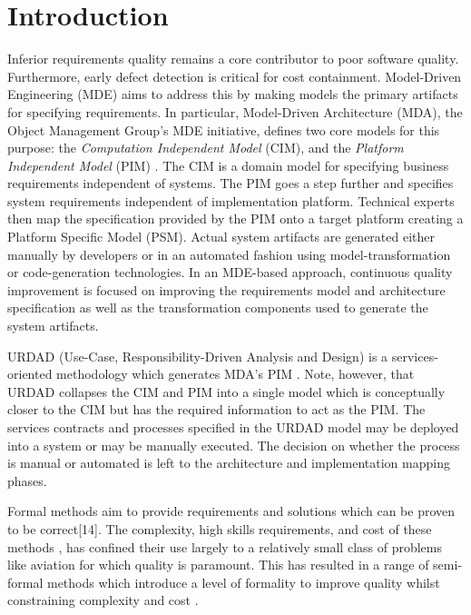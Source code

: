 \section{Introduction}\label{sec:Introduction}

Inferior requirements quality remains a core contributor to poor software quality\cite{heck_experiences_2008,_strategies_2011}. Furthermore, early defect detection is critical for cost containment\cite{betterReferenceThanBoehm1981WhichReliesOnWaterfall}. Model-Driven Engineering (MDE) \cite{frankel_model_2003} aims to address this by making models the primary artifacts for specifying requirements. In particular, Model-Driven Architecture (MDA), the Object Management Group's MDE initiative, defines two core models for this purpose: the \emph{Computation Independent Model} (CIM), and the \emph{Platform Independent Model} (PIM) \cite{_mda_2003}. The CIM is a domain model for specifying business requirements independent of systems. The PIM goes a step further and specifies system requirements independent of implementation platform. Technical experts then map the specification provided by the PIM onto a target platform creating a {Platform Specific Model} (PSM). Actual system artifacts are generated either manually by developers or in an automated fashion using model-transformation or code-generation technologies. In an MDE-based approach, continuous quality improvement is focused on improving the requirements model and architecture specification as well as the transformation components used to generate the system artifacts.

URDAD (Use-Case, Responsibility-Driven Analysis and Design) \cite{solms_technology_2007} is a services-oriented methodology which generates MDA's PIM \cite{solms_generating_2009}. Note, however, that URDAD collapses the CIM and PIM into a single model which is conceptually closer to the CIM but has the required information to act as the PIM. The services contracts and processes specified in the URDAD model may be deployed into a system or may be manually executed. The decision on whether the process is manual or automated is left to the architecture and implementation mapping phases. 

Formal methods aim to provide requirements and solutions which can be proven to be correct[14]. The complexity, high skills requirements, and cost of these methods \cite{}, has confined their use largely to a relatively small class of problems like aviation \cite{hall_software_1992} for which quality is paramount. This has resulted in a range of semi-formal methods which introduce a level of formality to improve quality whilst constraining complexity and cost \cite{}.

